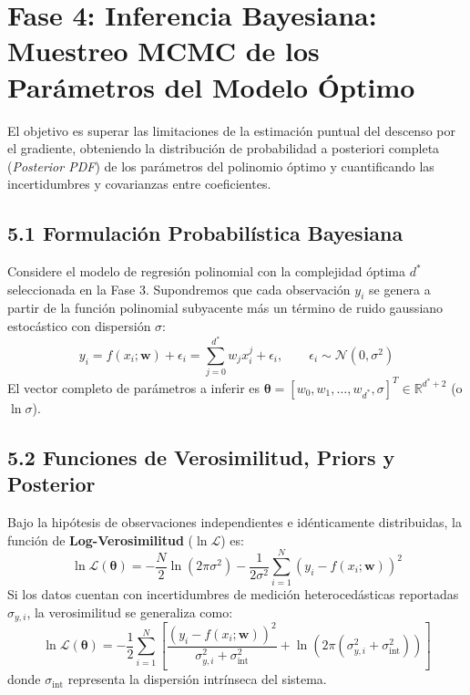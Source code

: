 \documentclass[11pt,a4paper]{article}
\begin{document}
\section{Fase 4: Inferencia Bayesiana: Muestreo MCMC de los Parámetros del Modelo Óptimo}
\label{sec:fase4}

\begin{fasebox}
El objetivo es superar las limitaciones de la estimación puntual del descenso por el gradiente, obteniendo la distribución de probabilidad a posteriori completa (\textit{Posterior PDF}) de los parámetros del polinomio óptimo y cuantificando las incertidumbres y covarianzas entre coeficientes.
\end{fasebox}

\subsection{5.1 Formulación Probabilística Bayesiana}
Considere el modelo de regresión polinomial con la complejidad óptima $d^*$ seleccionada en la Fase 3. Supondremos que cada observación $y_i$ se genera a partir de la función polinomial subyacente más un término de ruido gaussiano estocástico con dispersión $\sigma$:
\begin{equation}
    y_i = f(x_i; \mathbf{w}) + \epsilon_i = \sum_{j=0}^{d^*} w_j x_i^j + \epsilon_i, \qquad \epsilon_i \sim \mathcal{N}(0, \sigma^2)
\end{equation}
El vector completo de parámetros a inferir es $\bm{\theta} = [w_0, w_1, \dots, w_{d^*}, \sigma]^T \in \mathbb{R}^{d^* + 2}$ (o $\ln \sigma$).

\subsection{5.2 Funciones de Verosimilitud, Priors y Posterior}
Bajo la hipótesis de observaciones independientes e idénticamente distribuidas, la función de \textbf{Log-Verosimilitud} ($\ln \mathcal{L}$) es:
\begin{equation}
    \ln \mathcal{L}(\bm{\theta}) = -\frac{N}{2} \ln(2\pi\sigma^2) - \frac{1}{2\sigma^2} \sum_{i=1}^N \left( y_i - f(x_i; \mathbf{w}) \right)^2
\end{equation}
Si los datos cuentan con incertidumbres de medición heterocedásticas reportadas $\sigma_{y,i}$, la verosimilitud se generaliza como:
\begin{equation}
    \ln \mathcal{L}(\bm{\theta}) = -\frac{1}{2} \sum_{i=1}^N \left[ \frac{(y_i - f(x_i; \mathbf{w}))^2}{\sigma_{y,i}^2 + \sigma_{\text{int}}^2} + \ln\left(2\pi(\sigma_{y,i}^2 + \sigma_{\text{int}}^2)\right) \right]
\end{equation}
donde $\sigma_{\text{int}}$ representa la dispersión intrínseca del sistema.
\end{document}
